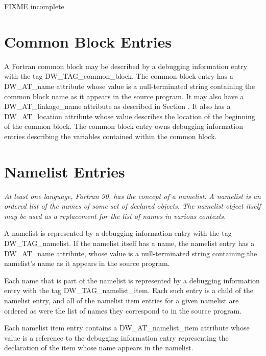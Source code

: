 FIXME incomplete


\section{Common Block Entries}
\label{chap:commonblockentries}
A Fortran common block may be described by a debugging
information entry with the tag DW\_TAG\_common\_block. The
common block entry has a DW\_AT\_name attribute whose value
is a null-terminated string containing the common block
name as it appears in the source program. It may also have a
DW\_AT\_linkage\_name attribute as described in 
Section . 
It
also has a DW\_AT\_location attribute whose value describes the
location of the beginning of the common block. The common
block entry owns debugging information entries describing
the variables contained within the common block.

\section{Namelist Entries}
\label{chap:namelistentries}
\textit{At least one language, Fortran 90, has the concept of a
namelist. A namelist is an ordered list of the names of some
set of declared objects. The namelist object itself may be used
as a replacement for the list of names in various contexts.}

A namelist is represented by a debugging information entry
with the tag DW\_TAG\_namelist. If the namelist itself has a
name, the namelist entry has a DW\_AT\_name attribute, whose
value is a null-terminated string containing the namelist’s
name as it appears in the source program.

Each name that is part of the namelist is represented
by a debugging information entry with the tag
DW\_TAG\_namelist\_item. Each such entry is a child of the
namelist entry, and all of the namelist item entries for a
given namelist are ordered as were the list of names they
correspond to in the source program.

Each namelist item entry contains a DW\_AT\_namelist\_item
attribute whose value is a reference to the debugging
information entry representing the declaration of the item
whose name appears in the namelist.


